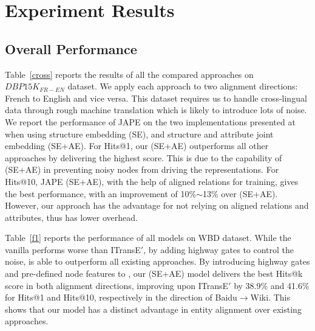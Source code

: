 \section{Experiment Results\label{sec:results}}



\subsection{Overall Performance\label{overall}}


 Table~\ref{cross} reports the results of all the compared approaches on $DBP15K_{FR-EN}$
dataset. We apply each approach
 to two alignment directions: French to English and vice versa. This dataset requires us to handle
cross-lingual data through rough machine translation which is likely to introduce lots of noise. We report the performance of JAPE on the
two implementations presented at
 ~\cite{sun2017cross} when using structure embedding (SE), and structure and attribute joint embedding (SE+AE).
For Hits@1, our \HRGCN (SE+AE)
outperforms all other approaches by delivering the highest score. This is due to the capability of \HRGCN
(SE+AE) in preventing noisy nodes from driving the \KG representations. For Hits@10, JAPE (SE+AE), with the help of aligned relations for training,
 gives the best performance, with an improvement of 10\%$\sim$13\% over \HRGCN (SE+AE). However, our approach has the advantage for not relying on aligned
relations and attributes, thus has lower overhead.


 Table~\ref{f1} reports the performance of all models on WBD dataset. While the vanilla \GCN performs worse than
ITransE$'$, by adding highway gates to control the noise, \HGCN is able to outperform all existing approaches. By introducing highway gates and pre-defined node features to \RGCN, our \HRGCN (SE+AE) model delivers the best Hits@k score in both alignment directions,
improving upon ITransE$'$ by 38.9\% and 41.6\% for Hits@1 and Hits@10, respectively in the direction of
Baidu$\rightarrow$Wiki. This shows that our model has a distinct advantage in entity alignment over existing approaches.


